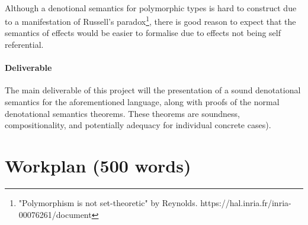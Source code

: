 \documentclass[11pt]{article}
\begin{document}
\paragraph{}{
Although a denotional semantics for polymorphic types is hard to construct due to a manifestation of Russell's paradox\footnote{"Polymorphism
is not set-theoretic" by Reynolds. https://hal.inria.fr/inria-00076261/document}, there is good reason to expect that the semantics of effects would be easier to formalise due to effects not being self referential.
}




\paragraph{Deliverable}{
The main deliverable of this project will the presentation of a sound denotational semantics for the aforementioned language, along with proofs of the normal denotational semantics theorems. These theorems are soundness, compositionality, and potentially adequacy for individual concrete cases).
}



\section{Workplan (500 words)}
\end{document}
